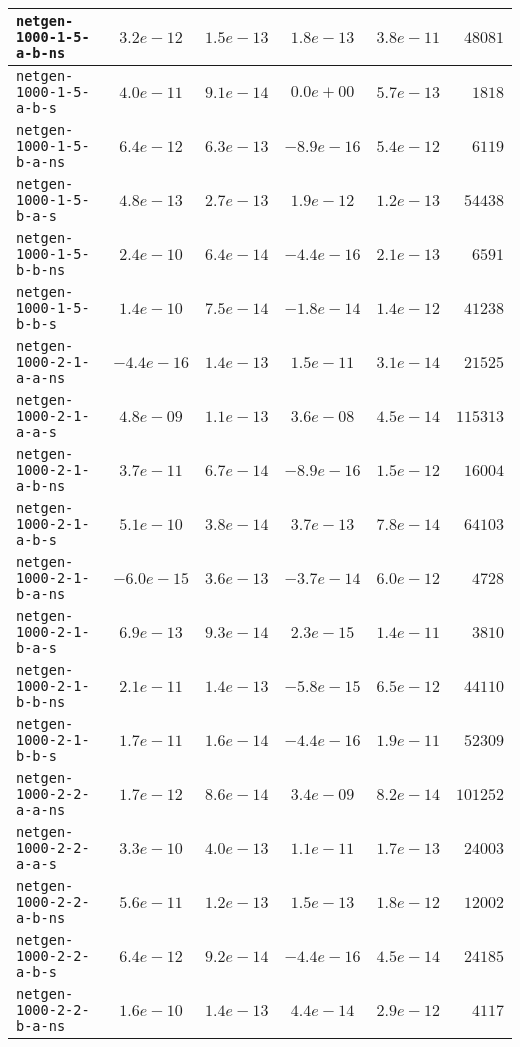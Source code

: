 \begin{center}
\begin{longtable}{|l || c | c | c | c | r|}
\hline
\texttt{netgen-1000-1-5-a-b-ns} & $3.2e-12$ & $1.5e-13$ & $1.8e-13$ & $3.8e-11$ & $48081$ \\
\hline
\texttt{netgen-1000-1-5-a-b-s} & $4.0e-11$ & $9.1e-14$ & $0.0e+00$ & $5.7e-13$ & $1818$ \\
\hline
\texttt{netgen-1000-1-5-b-a-ns} & $6.4e-12$ & $6.3e-13$ & $-8.9e-16$ & $5.4e-12$ & $6119$ \\
\hline
\texttt{netgen-1000-1-5-b-a-s} & $4.8e-13$ & $2.7e-13$ & $1.9e-12$ & $1.2e-13$ & $54438$ \\
\hline
\texttt{netgen-1000-1-5-b-b-ns} & $2.4e-10$ & $6.4e-14$ & $-4.4e-16$ & $2.1e-13$ & $6591$ \\
\hline
\texttt{netgen-1000-1-5-b-b-s} & $1.4e-10$ & $7.5e-14$ & $-1.8e-14$ & $1.4e-12$ & $41238$ \\
\hline
\texttt{netgen-1000-2-1-a-a-ns} & $-4.4e-16$ & $1.4e-13$ & $1.5e-11$ & $3.1e-14$ & $21525$ \\
\hline
\texttt{netgen-1000-2-1-a-a-s} & $4.8e-09$ & $1.1e-13$ & $3.6e-08$ & $4.5e-14$ & $115313$ \\
\hline
\texttt{netgen-1000-2-1-a-b-ns} & $3.7e-11$ & $6.7e-14$ & $-8.9e-16$ & $1.5e-12$ & $16004$ \\
\hline
\texttt{netgen-1000-2-1-a-b-s} & $5.1e-10$ & $3.8e-14$ & $3.7e-13$ & $7.8e-14$ & $64103$ \\
\hline
\texttt{netgen-1000-2-1-b-a-ns} & $-6.0e-15$ & $3.6e-13$ & $-3.7e-14$ & $6.0e-12$ & $4728$ \\
\hline
\texttt{netgen-1000-2-1-b-a-s} & $6.9e-13$ & $9.3e-14$ & $2.3e-15$ & $1.4e-11$ & $3810$ \\
\hline
\texttt{netgen-1000-2-1-b-b-ns} & $2.1e-11$ & $1.4e-13$ & $-5.8e-15$ & $6.5e-12$ & $44110$ \\
\hline
\texttt{netgen-1000-2-1-b-b-s} & $1.7e-11$ & $1.6e-14$ & $-4.4e-16$ & $1.9e-11$ & $52309$ \\
\hline
\texttt{netgen-1000-2-2-a-a-ns} & $1.7e-12$ & $8.6e-14$ & $3.4e-09$ & $8.2e-14$ & $101252$ \\
\hline
\texttt{netgen-1000-2-2-a-a-s} & $3.3e-10$ & $4.0e-13$ & $1.1e-11$ & $1.7e-13$ & $24003$ \\
\hline
\texttt{netgen-1000-2-2-a-b-ns} & $5.6e-11$ & $1.2e-13$ & $1.5e-13$ & $1.8e-12$ & $12002$ \\
\hline
\texttt{netgen-1000-2-2-a-b-s} & $6.4e-12$ & $9.2e-14$ & $-4.4e-16$ & $4.5e-14$ & $24185$ \\
\hline
\texttt{netgen-1000-2-2-b-a-ns} & $1.6e-10$ & $1.4e-13$ & $4.4e-14$ & $2.9e-12$ & $4117$ \\

\end{longtable}
\end{center}
